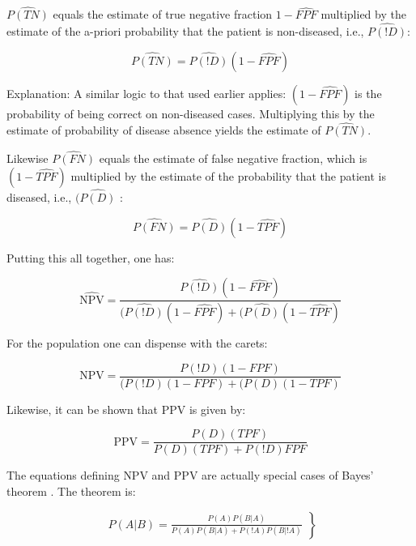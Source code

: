 \documentclass[
]{book}
\begin{document}
\(\widehat{P(TN)}\) equals the estimate of true negative fraction \(1-\widehat{FPF}\) multiplied by the estimate of the a-priori probability that the patient is non-diseased, i.e., \(\widehat{P(!D)}\):

\begin{equation} 
\widehat{P(TN)}=\widehat{P(!D)}(1-\widehat{FPF})
\label{eq:binary-task-p-tn-est}
\end{equation}

Explanation: A similar logic to that used earlier applies: \((1-\widehat{FPF})\) is the probability of being correct on non-diseased cases. Multiplying this by the estimate of probability of disease absence yields the estimate of \(\widehat{P(TN)}\).

Likewise \(\widehat{P(FN)}\) equals the estimate of false negative fraction, which is \((1-\widehat{TPF})\) multiplied by the estimate of the probability that the patient is diseased, i.e., \((\widehat{P(D)}\) :

\begin{equation} 
\widehat{P(FN)}=\widehat{P(D)}(1-\widehat{TPF})
\label{eq:binary-task-p-fn-est}
\end{equation}

Putting this all together, one has:

\begin{equation} 
\widehat{\text{NPV}}=\frac{\widehat{P(!D)}(1-\widehat{FPF})}{(\widehat{P(!D)}(1-\widehat{FPF})+(\widehat{P(D)}(1-\widehat{TPF})}
\label{eq:binary-task-npv-est}
\end{equation}

For the population one can dispense with the carets:

\begin{equation} 
\text{NPV}=\frac{P(!D)(1-FPF)}{(P(!D)(1-FPF)+(P(D)(1-TPF)}
\label{eq:binary-task-npv-pop}
\end{equation}

Likewise, it can be shown that \(\text{PPV}\) is given by:

\begin{equation} 
\text{PPV} =\frac{P(D)(TPF)}{P(D)(TPF)+P(!D)FPF}
\label{eq:binary-task-ppv-pop}
\end{equation}

The equations defining \(\text{NPV}\) and \(\text{PPV}\) are actually special cases of Bayes' theorem \citep{larsen2005introduction}. The theorem is:

\begin{equation} 
\left.
\begin{aligned}
P(A|B)=\frac{P(A)P(B|A)}{P(A)P(B|A)+P(!A)P(B|!A)}
\end{aligned}
\right \}
\label{eq:binary-task-bayes}
\end{equation}
\end{document}
